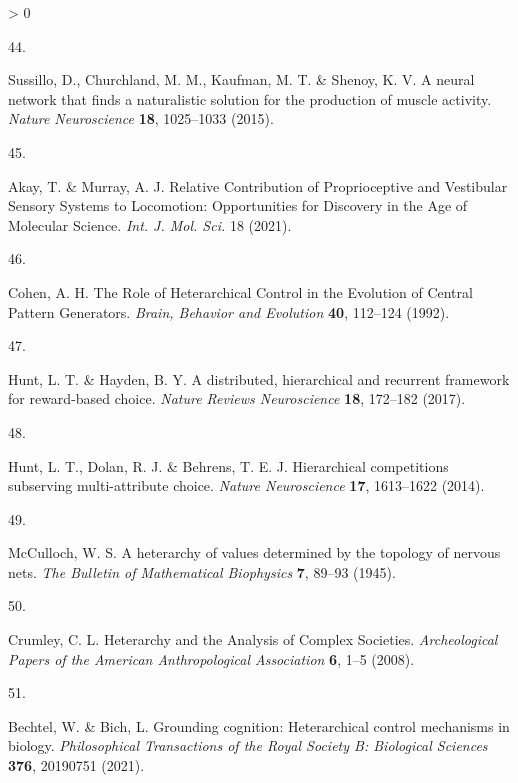 \documentclass[
  a4paper,
]{article}
\newlength{\cslhangindent}
\newlength{\csllabelwidth}
\newenvironment{CSLReferences}[2] %
 {%
  \setlength{\parindent}{0pt}
  \ifodd #1 \everypar{\setlength{\hangindent}{\cslhangindent}}\ignorespaces\fi
  \ifnum #2 > 0
  \setlength{\parskip}{#2\baselineskip}
  \fi
 }%
 {}
\newcommand{\CSLLeftMargin}[1]{\parbox[t]{\csllabelwidth}{#1}}
\newcommand{\CSLRightInline}[1]{\parbox[t]{\linewidth - \csllabelwidth}{#1}\break}
\begin{document}
\begin{CSLReferences}{0}{0}
\leavevmode\hypertarget{ref-sussillo2015}{}%
\CSLLeftMargin{44. }
\CSLRightInline{Sussillo, D., Churchland, M. M., Kaufman, M. T. \&
Shenoy, K. V. A neural network that finds a naturalistic solution for
the production of muscle activity. \emph{Nature Neuroscience}
\textbf{18}, 1025--1033 (2015).}

\leavevmode\hypertarget{ref-akayRelativeContributionProprioceptive2021}{}%
\CSLLeftMargin{45. }
\CSLRightInline{Akay, T. \& Murray, A. J. Relative {Contribution} of
{Proprioceptive} and {Vestibular Sensory Systems} to {Locomotion}:
{Opportunities} for {Discovery} in the {Age} of {Molecular Science}.
\emph{Int. J. Mol. Sci.} 18 (2021).}

\leavevmode\hypertarget{ref-cohenRoleHeterarchicalControl1992}{}%
\CSLLeftMargin{46. }
\CSLRightInline{Cohen, A. H. The {Role} of {Heterarchical Control} in
the {Evolution} of {Central Pattern Generators}. \emph{Brain, Behavior
and Evolution} \textbf{40}, 112--124 (1992).}

\leavevmode\hypertarget{ref-huntDistributedHierarchicalRecurrent2017}{}%
\CSLLeftMargin{47. }
\CSLRightInline{Hunt, L. T. \& Hayden, B. Y. A distributed, hierarchical
and recurrent framework for reward-based choice. \emph{Nature Reviews
Neuroscience} \textbf{18}, 172--182 (2017).}

\leavevmode\hypertarget{ref-huntHierarchicalCompetitionsSubserving2014}{}%
\CSLLeftMargin{48. }
\CSLRightInline{Hunt, L. T., Dolan, R. J. \& Behrens, T. E. J.
Hierarchical competitions subserving multi-attribute choice.
\emph{Nature Neuroscience} \textbf{17}, 1613--1622 (2014).}

\leavevmode\hypertarget{ref-mccullochHeterarchyValuesDetermined1945}{}%
\CSLLeftMargin{49. }
\CSLRightInline{McCulloch, W. S. A heterarchy of values determined by
the topology of nervous nets. \emph{The Bulletin of Mathematical
Biophysics} \textbf{7}, 89--93 (1945).}

\leavevmode\hypertarget{ref-crumleyHeterarchyAnalysisComplex2008}{}%
\CSLLeftMargin{50. }
\CSLRightInline{Crumley, C. L. Heterarchy and the {Analysis} of {Complex
Societies}. \emph{Archeological Papers of the American Anthropological
Association} \textbf{6}, 1--5 (2008).}

\leavevmode\hypertarget{ref-bechtelGroundingCognitionHeterarchical2021}{}%
\CSLLeftMargin{51. }
\CSLRightInline{Bechtel, W. \& Bich, L. Grounding cognition:
Heterarchical control mechanisms in biology. \emph{Philosophical
Transactions of the Royal Society B: Biological Sciences} \textbf{376},
20190751 (2021).}


\end{CSLReferences}
\end{document}
